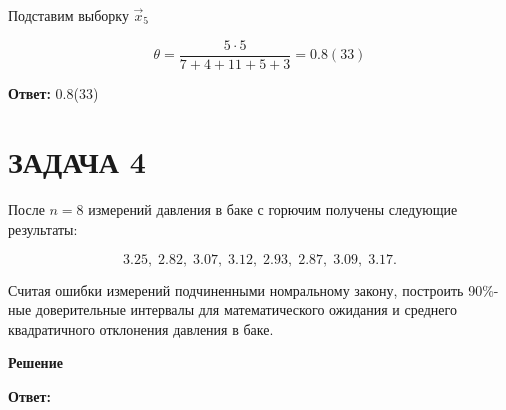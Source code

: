 \documentclass[12pt, a4paper]{report}
\begin{document}
	Подставим выборку $\vec x_5$
	
	\begin{equation*}
	\theta = \frac{5 \cdot 5}{7 + 4 + 11 + 5 + 3} = 0.8(33)
	\end{equation*}
	
	\vspace{0.5cm}
	\textbf{Ответ:} 0.8(33)
	
	
	
	
	
	
	
	
	\newpage
	
	\section{ЗАДАЧА 4}
	
	\hspace{0.4cm} После $n = 8$ измерений давления в баке с горючим получены следующие результаты:
	
	\begin{equation*}
	3.25,\; 2.82,\; 3.07,\; 3.12,\; 2.93,\; 2.87,\; 3.09,\; 3.17.
	\end{equation*}
	
	Считая ошибки измерений подчиненными номральному закону, построить 90\%-ные доверительные интервалы для математического ожидания и среднего квадратичного отклонения давления в баке.
	
	
	\vspace{0.2cm}
	\textbf{Решение}
	
	\vspace{0.5cm}
	\textbf{Ответ:}
	
\end{document}
